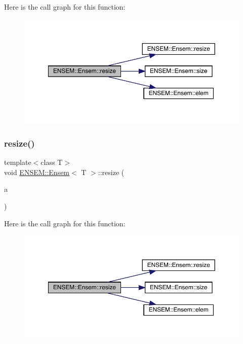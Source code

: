 Here is the call graph for this function\+:
\nopagebreak
\begin{figure}[H]
\begin{center}
\leavevmode
\includegraphics[width=350pt]{d7/d3e/classENSEM_1_1Ensem_acf1e1629e4e10dbd254d81d14271b763_cgraph}
\end{center}
\end{figure}
\mbox{\label{classENSEM_1_1Ensem_acf1e1629e4e10dbd254d81d14271b763}} 
\subsubsection{\texorpdfstring{resize()}{resize()}\hspace{0.1cm}{\footnotesize\ttfamily [5/6]}}
{\footnotesize\ttfamily template$<$class T$>$ \\
void \mbox{\hyperlink{classENSEM_1_1Ensem}{E\+N\+S\+E\+M\+::\+Ensem}}$<$ T $>$\+::resize (\begin{DoxyParamCaption}\item[{const \mbox{\hyperlink{classENSEM_1_1Ensem}{Ensem}}$<$ T $>$ \&}]{a }\end{DoxyParamCaption})\hspace{0.3cm}{\ttfamily [inline]}}

Here is the call graph for this function\+:
\nopagebreak
\begin{figure}[H]
\begin{center}
\leavevmode
\includegraphics[width=350pt]{d7/d3e/classENSEM_1_1Ensem_acf1e1629e4e10dbd254d81d14271b763_cgraph}
\end{center}
\end{figure}
\mbox{\label{classENSEM_1_1Ensem_acf1e1629e4e10dbd254d81d14271b763}} 
